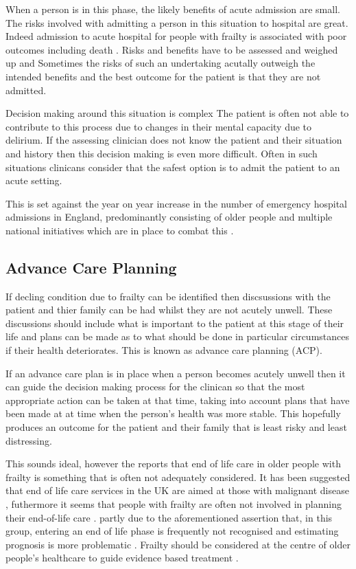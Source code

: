 \documentclass
[
	12pt,
	a4paper,
	oneside,
]{report}
\begin{document}
When a person is in this phase, the likely benefits of acute admission are small.
The risks involved with admitting a person in this situation
to hospital are great.  
Indeed admission to acute hospital for people with frailty is associated with
poor outcomes including death \parencite{silver:12, wallis:15}. Risks and 
benefits have to be assessed and 
weighed up and Sometimes the risks of such an undertaking acutally
outweigh the intended benefits and the best outcome for the patient is that 
they are not admitted. 

Decision making around this situation is complex 
The patient is often not able to contribute to this process due to changes in their
mental capacity due to delirium. If the assessing clinician does not know the 
patient and their situation and history then this decision making is even more 
difficult. Often in such situations clinicans consider that the safest option is to 
admit the patient to an acute setting.

This is set against the year on year increase in the number of emergency hospital 
admissions in England, predominantly consisting of older people and multiple 
national initiatives which are in place to combat this \parencite{nao:18}.

\subsection{Advance Care Planning}

If decling condition due to frailty can be identified then discsussions with the 
patient and thier family can be had whilst they are not acutely unwell. These 
discussions should include what is important to the patient at this stage of their
life and plans can be made as to what should be done in particular circumstances
if their health deteriorates. This is known as advance care planning (ACP).

If an advance care plan is in place when a person becomes acutely unwell then it
can guide the decision making process for the clinican so that the most appropriate
action can be taken at that time, taking into account plans that have been made 
at at time when the person's health was more stable. This hopefully produces an
outcome for the patient and their family that is least risky and least distressing.

This sounds ideal, however the \textcite{silver:12} reports that end of life care 
in older people with frailty
is something that is often not adequately considered. It has been suggested that 
end of life care services in the UK are aimed at those with malignant 
disease \parencite{sharp:13}, futhermore it seems that people with frailty 
are often not involved in planning their 
end-of-life care \textcite{oliver:14}. partly due to the aforementioned assertion 
that, in this group, entering an end of life phase is frequently not recognised and
estimating prognosis is more problematic \parencite{silver:12}.
Frailty should be considered at the centre of older people's healthcare to guide
evidence based treatment \parencite{woo:14}.
\end{document}
